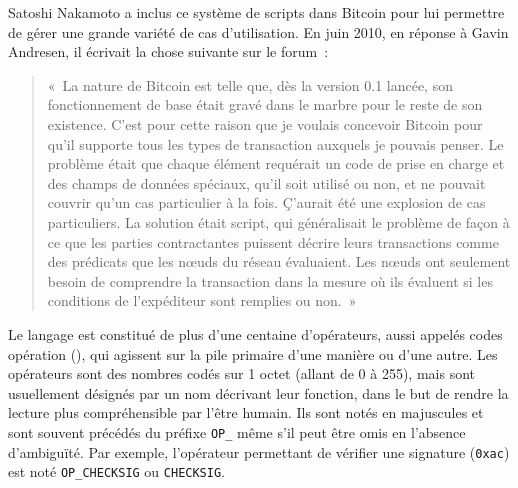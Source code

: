 Satoshi Nakamoto a inclus ce système de scripts dans Bitcoin pour lui permettre de gérer une grande variété de cas d'utilisation. En juin 2010, en réponse à Gavin Andresen, il écrivait la chose suivante sur le forum~:

\begin{quote}
«~La nature de Bitcoin est telle que, dès la version 0.1 lancée, son fonctionnement de base était gravé dans le marbre pour le reste de son existence. C'est pour cette raison que je voulais concevoir Bitcoin pour qu'il supporte tous les types de transaction auxquels je pouvais penser. Le problème était que chaque élément requérait un code de prise en charge et des champs de données spéciaux, qu'il soit utilisé ou non, et ne pouvait couvrir qu'un cas particulier à la fois. Ç'aurait été une explosion de cas particuliers. La solution était script, qui généralisait le problème de façon à ce que les parties contractantes puissent décrire leurs transactions comme des prédicats que les nœuds du réseau évaluaient. Les nœuds ont seulement besoin de comprendre la transaction dans la mesure où ils évaluent si les conditions de l'expéditeur sont remplies ou non.~»
\end{quote} %

Le langage est constitué de plus d'une centaine d'opérateurs, aussi appelés codes opération (), qui agissent sur la pile primaire d'une manière ou d'une autre. Les opérateurs sont des nombres codés sur 1 octet (allant de 0 à 255), mais sont usuellement désignés par un nom décrivant leur fonction, dans le but de rendre la lecture plus compréhensible par l'être humain. Ils sont notés en majuscules et sont souvent précédés du préfixe \texttt{OP\_} même s'il peut être omis en l'absence d'ambiguïté. Par exemple, l'opérateur permettant de vérifier une signature (\texttt{0xac}) est noté \texttt{OP\_CHECKSIG} ou \texttt{CHECKSIG}.

